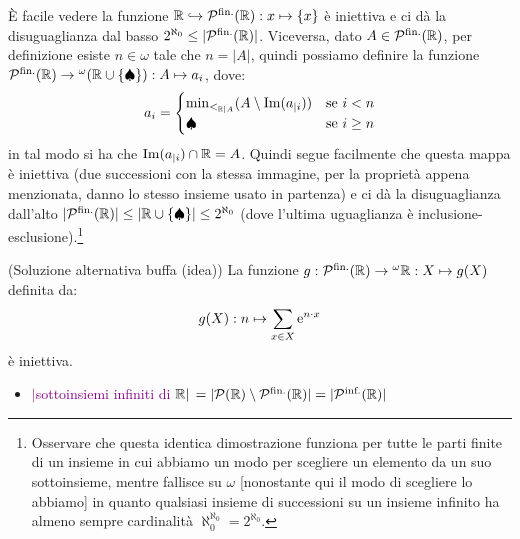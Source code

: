 \begin{soln}
	\`E facile vedere la funzione $\mathbb R \hookrightarrow \mathcal{P}^{\text{fin.}}(\mathbb R) : x \mapsto \{x\}$ \`e iniettiva e ci d\`a la disuguaglianza dal basso $2^{\aleph_0} \leq|\mathcal{P}^{\text{fin.}}(\mathbb R)|$. Viceversa, dato $A \in \mathcal{P}^{\text{fin.}}(\mathbb R)$, per definizione esiste $n \in \omega$ tale che $n = |A|$,
	quindi possiamo definire la funzione $\mathcal{P}^{\text{fin.}}(\mathbb R) \to {}^\omega(\mathbb R \cup \{\spadesuit\}) : A \mapsto a_i$, dove:
	\[ a_{i} = \begin{cases}
		\min_{<_{\mathbb R|A}}(A\setminus\operatorname{Im}(a_{|i}))&\text{se $i < n$} \\
		\spadesuit &\text{se $i \geq n$}
	\end{cases}
		\]
	in tal modo si ha che $\operatorname{Im}(a_{|i}) \cap \mathbb R = A$. Quindi segue facilmente che questa mappa \`e iniettiva (due successioni con la stessa immagine, per la propriet\`a appena menzionata, danno lo stesso insieme usato in partenza) e ci d\`a la disuguaglianza dall'alto 
	$|\mathcal{P}^{\text{fin.}}(\mathbb R)| \leq |\mathbb R \cup \{\spadesuit\}| \leq 2^{\aleph_0}$ (dove l'ultima uguaglianza \`e inclusione-esclusione).\footnote{Osservare che questa identica dimostrazione funziona per tutte le parti finite di un insieme in cui abbiamo un modo per scegliere un elemento da un suo sottoinsieme, mentre fallisce su $\omega$ [nonostante qui il modo di scegliere lo abbiamo] in 
	quanto qualsiasi insieme di successioni su un insieme infinito ha almeno sempre cardinalit\`a $\aleph_0^{\aleph_0} = 2^{\aleph_0}$.}
\end{soln}

\begin{soln}
	(Soluzione alternativa buffa (idea))
	La funzione $g : \mathcal{P}^{\text{fin.}}(\mathbb R) \to {}^\omega\mathbb R : X \mapsto g(X)$ definita da:
	\[ g(X) : n \mapsto \sum_{x \in X} \text e^{n \cdot x}
		\]
	\`e iniettiva.
\end{soln}

\begin{itemize}
	\item \textcolor{purple}{$|$sottoinsiemi infiniti di $\mathbb R|$ $= |\mathcal{P}(\mathbb R)\setminus\mathcal{P}^{\text{fin.}}(\mathbb R)| = |\mathcal{P}^{\text{inf.}}(\mathbb R)|$}
\end{itemize}

